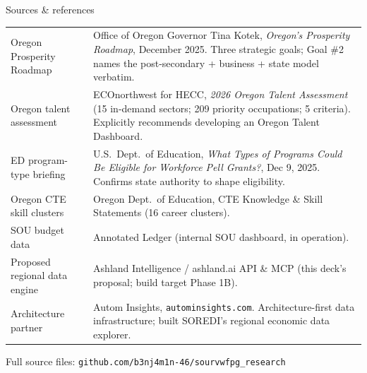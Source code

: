\documentclass[aspectratio=169,11pt]{beamer}
\newcommand{\monoLabel}[1]{%
  {\ttfamily\fontsize{7.5pt}{9pt}\selectfont\color{textMuted}#1}%
}
\begin{document}
\begin{frame}{Sources \& references}
\begin{tabular}{@{}p{4.6cm}p{9.4cm}@{}}
    \addlinespace[1pt]
    Oregon Prosperity Roadmap
      & Office of Oregon Governor Tina Kotek, \emph{Oregon's Prosperity Roadmap}, December 2025. Three strategic goals; Goal \#2 names the post-secondary + business + state model verbatim.\\
    \addlinespace[1pt]
    Oregon talent assessment
      & ECOnorthwest for HECC, \emph{2026 Oregon Talent Assessment} (15 in-demand sectors; 209 priority occupations; 5 criteria). Explicitly recommends developing an Oregon Talent Dashboard.\\
    \addlinespace[1pt]
    ED program-type briefing
      & U.S.\ Dept.\ of Education, \emph{What Types of Programs Could Be Eligible for Workforce Pell Grants?}, Dec 9, 2025. Confirms state authority to shape eligibility.\\
    \addlinespace[1pt]
    Oregon CTE skill clusters
      & Oregon Dept.\ of Education, CTE Knowledge \& Skill Statements (16 career clusters).\\
    \midrule
    SOU budget data
      & Annotated Ledger (internal SOU dashboard, in operation).\\
    \addlinespace[1pt]
    Proposed regional data engine
      & Ashland Intelligence \;/\; ashland.ai API \& MCP (this deck's proposal; build target Phase 1B\textendash 2).\\
    \addlinespace[1pt]
    Architecture partner
      & Autom Insights, \texttt{autominsights.com}. Architecture-first data infrastructure; built SOREDI's regional economic data explorer.\\
    \bottomrule
  \end{tabular}
  \vspace{6pt}\par
  {\centering
   \monoLabel{Full source files: \texttt{github.com/b3nj4m1n-46/sourvwfpg\_research}}\par}
\end{frame}
\end{document}

